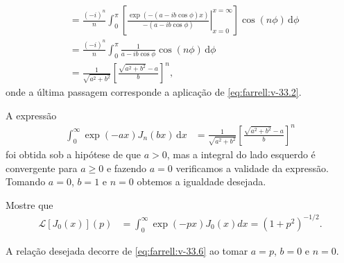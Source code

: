 \documentclass[a4paper,12pt, leqno, answers]{exam}
\begin{document}
\begin{questions}
\begin{solution}
\begin{align*}
            &= \frac{(-i)^n}{n} \int_0^\pi \left[ \left. \frac{\exp(-(a - ib \cos\phi)x)}{-(a - i b \cos\phi)} \right|_{x = 0}^{x = \infty} \right] \cos(n \phi) \,\mathrm{d}\phi \\
            &= \frac{(-i)^n}{n} \int_0^\pi \frac{1}{a - i b \cos\phi} \cos(n \phi) \,\mathrm{d}\phi \\
            &= \frac{1}{\sqrt{a^2 + b^2}} \left[ \frac{\sqrt{a^2 + b^2} - a}{b} \right]^n,
        \end{align*}
        onde a \'{u}ltima passagem corresponde a aplica\c{c}\~{a}o de \eqref{eq:farrell:v-33.2}.

        A express\~{a}o
        \begin{align}
            \int_0^\infty \exp(-ax) J_n(bx) \,\mathrm{d}x &= \frac{1}{\sqrt{a^2 + b^2}} \left[ \frac{\sqrt{a^2 + b^2} - a}{b} \right]^n \label{eq:farrell:v-33.6}
        \end{align}
        foi obtida sob a hip\'{o}tese de que $a > 0$, mas a integral do lado esquerdo \'{e} convergente para $a \geq 0$ e fazendo $a = 0$ verificamos a validade da express\~{a}o. Tomando $a = 0$, $b = 1$ e $n = 0$ obtemos a igualdade desejada.
    \end{solution}

    \question Mostre que
    \begin{align*}
        \mathcal{L}[J_0(x)](p) &= \int_0^\infty \exp(-px) J_0(x) dx = (1 + p^2)^{-1/2}.
    \end{align*}
    \begin{solution}
        A rela\c{c}\~{a}o desejada decorre de \eqref{eq:farrell:v-33.6} ao tomar $a = p$, $b = 0$ e $n = 0$.


\end{solution}
\end{questions}
\end{document}
